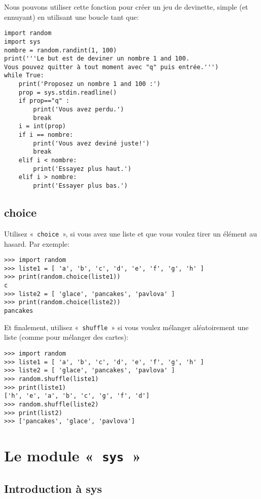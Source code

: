 Nous pouvons utiliser cette fonction pour créer un jeu de devinette, simple (et ennuyant) en utilisant une boucle tant que:

\begin{Verbatim}[frame=single,rulecolor=\color{gray}]
import random
import sys
nombre = random.randint(1, 100)
print('''Le but est de deviner un nombre 1 and 100.
Vous pouvez quitter à tout moment avec "q" puis entrée.''')
while True:
    print('Proposez un nombre 1 and 100 :')
    prop = sys.stdin.readline()
    if prop=="q" :
        print('Vous avez perdu.')
        break
    i = int(prop)
    if i == nombre:
        print('Vous avez deviné juste!')
        break
    elif i < nombre:
        print('Essayez plus haut.')
    elif i > nombre:
        print('Essayer plus bas.')
\end{Verbatim}

\subsection{choice}

Utilisez « \verb+choice+ »,  si vous avez une liste et que vous voulez tirer un élément au hasard. Par exemple:

\begin{Verbatim}[frame=single,rulecolor=\color{gray}]
>>> import random
>>> liste1 = [ 'a', 'b', 'c', 'd', 'e', 'f', 'g', 'h' ]
>>> print(random.choice(liste1))
c
>>> liste2 = [ 'glace', 'pancakes', 'pavlova' ]
>>> print(random.choice(liste2))
pancakes
\end{Verbatim}

Et finalement, utilisez « \verb+shuffle+ » si vous voulez mélanger aléatoirement une liste (comme pour mélanger des cartes):

\begin{Verbatim}[frame=single,rulecolor=\color{gray}]
>>> import random
>>> liste1 = [ 'a', 'b', 'c', 'd', 'e', 'f', 'g', 'h' ]
>>> liste2 = [ 'glace', 'pancakes', 'pavlova' ]
>>> random.shuffle(liste1)
>>> print(liste1)
['h', 'e', 'a', 'b', 'c', 'g', 'f', 'd']
>>> random.shuffle(liste2)
>>> print(list2)
>>> ['pancakes', 'glace', 'pavlova']
\end{Verbatim}

\section{Le module « \texttt{sys} »}
\subsection{Introduction à sys}

